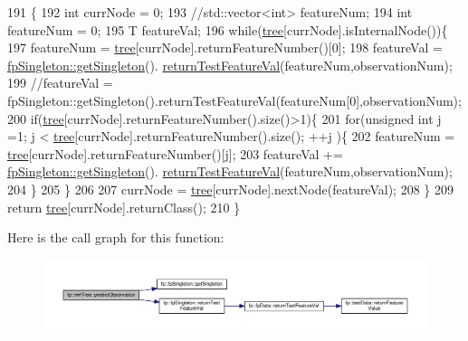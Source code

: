 \begin{DoxyCode}
191                                                                  \{
192                     \textcolor{keywordtype}{int} currNode = 0;
193                     \textcolor{comment}{//std::vector<int> featureNum;}
194                     \textcolor{keywordtype}{int} featureNum = 0;
195                     T featureVal;
196                     \textcolor{keywordflow}{while}(\hyperlink{classfp_1_1rerfTree_afc9392154cb4d1dde02e26a9ec31e356}{tree}[currNode].isInternalNode())\{
197                         featureNum = \hyperlink{classfp_1_1rerfTree_afc9392154cb4d1dde02e26a9ec31e356}{tree}[currNode].returnFeatureNumber()[0];
198                         featureVal = \hyperlink{classfp_1_1fpSingleton_a8bdae77b68521003e3fc630edec2e240}{fpSingleton::getSingleton}().
      \hyperlink{classfp_1_1fpSingleton_ad74b421d65b17ba924244bff31fc9db6}{returnTestFeatureVal}(featureNum,observationNum);
199                         \textcolor{comment}{//featureVal =
       fpSingleton::getSingleton().returnTestFeatureVal(featureNum[0],observationNum);}
200                         \textcolor{keywordflow}{if}(\hyperlink{classfp_1_1rerfTree_afc9392154cb4d1dde02e26a9ec31e356}{tree}[currNode].returnFeatureNumber().size()>1)\{
201                             \textcolor{keywordflow}{for}(\textcolor{keywordtype}{unsigned} \textcolor{keywordtype}{int} j =1; j < \hyperlink{classfp_1_1rerfTree_afc9392154cb4d1dde02e26a9ec31e356}{tree}[currNode].returnFeatureNumber().size(); ++j
      )\{
202                         featureNum = \hyperlink{classfp_1_1rerfTree_afc9392154cb4d1dde02e26a9ec31e356}{tree}[currNode].returnFeatureNumber()[j];
203                                 featureVal += \hyperlink{classfp_1_1fpSingleton_a8bdae77b68521003e3fc630edec2e240}{fpSingleton::getSingleton}().
      \hyperlink{classfp_1_1fpSingleton_ad74b421d65b17ba924244bff31fc9db6}{returnTestFeatureVal}(featureNum,observationNum);
204                             \}
205                         \}
206                         
207                         currNode = \hyperlink{classfp_1_1rerfTree_afc9392154cb4d1dde02e26a9ec31e356}{tree}[currNode].nextNode(featureVal);
208                     \}
209                     \textcolor{keywordflow}{return} \hyperlink{classfp_1_1rerfTree_afc9392154cb4d1dde02e26a9ec31e356}{tree}[currNode].returnClass();
210                 \}
\end{DoxyCode}
Here is the call graph for this function\+:
\nopagebreak
\begin{figure}[H]
\begin{center}
\leavevmode
\includegraphics[width=350pt]{classfp_1_1rerfTree_a254ba4e644b4ad419809868ac34f6a44_cgraph}
\end{center}
\end{figure}
\mbox{\label{classfp_1_1rerfTree_a25a1fa35e8ad02bfb1d390679152e798}} 
